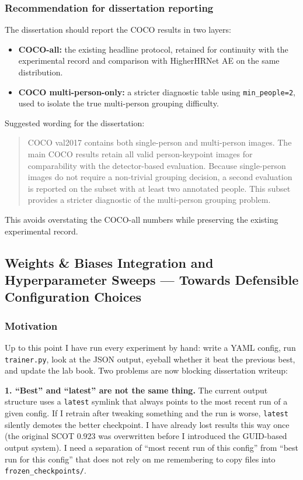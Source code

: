 \subsubsection{Recommendation for dissertation reporting}

The dissertation should report the COCO results in two layers:

\begin{itemize}
    \item \textbf{COCO-all:} the existing headline protocol, retained for continuity with the experimental record and comparison with HigherHRNet AE on the same distribution.
    \item \textbf{COCO multi-person-only:} a stricter diagnostic table using \texttt{min\_people=2}, used to isolate the true multi-person grouping difficulty.
\end{itemize}

Suggested wording for the dissertation:

\begin{quote}
COCO val2017 contains both single-person and multi-person images.
The main COCO results retain all valid person-keypoint images for comparability with the detector-based evaluation.
Because single-person images do not require a non-trivial grouping decision, a second evaluation is reported on the subset with at least two annotated people.
This subset provides a stricter diagnostic of the multi-person grouping problem.
\end{quote}

This avoids overstating the COCO-all numbers while preserving the existing experimental record.

\subsection{Weights \& Biases Integration and Hyperparameter Sweeps --- Towards Defensible Configuration Choices}

\subsubsection{Motivation}

Up to this point I have run every experiment by hand: write a YAML config, run \texttt{trainer.py}, look at the JSON output, eyeball whether it beat the previous best, and update the lab book. Two problems are now blocking dissertation writeup:

\textbf{1. ``Best'' and ``latest'' are not the same thing.} The current output structure uses a \texttt{latest} symlink that always points to the most recent run of a given config. If I retrain after tweaking something and the run is worse, \texttt{latest} silently demotes the better checkpoint. I have already lost results this way once (the original SCOT 0.923 was overwritten before I introduced the GUID-based output system). I need a separation of ``most recent run of this config'' from ``best run for this config'' that does not rely on me remembering to copy files into \texttt{frozen\_checkpoints/}.

